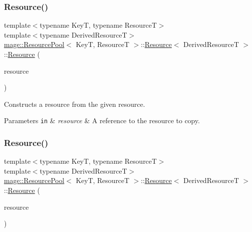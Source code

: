 \subsubsection{\texorpdfstring{Resource()}{Resource()}\hspace{0.1cm}{\footnotesize\ttfamily [2/3]}}
{\footnotesize\ttfamily template$<$typename KeyT, typename ResourceT$>$ \\
template$<$typename Derived\+ResourceT$>$ \\
\hyperlink{classmage_1_1_resource_pool}{mage\+::\+Resource\+Pool}$<$ KeyT, ResourceT $>$\+::\hyperlink{structmage_1_1_resource_pool_1_1_resource}{Resource}$<$ Derived\+ResourceT $>$\+::\hyperlink{structmage_1_1_resource_pool_1_1_resource}{Resource} (\begin{DoxyParamCaption}\item[{const \hyperlink{structmage_1_1_resource_pool_1_1_resource}{Resource}$<$ Derived\+ResourceT $>$ \&}]{resource }\end{DoxyParamCaption})\hspace{0.3cm}{\ttfamily [delete]}}

Constructs a resource from the given resource.


\begin{DoxyParams}[1]{Parameters}
\mbox{\tt in}  & {\em resource} & A reference to the resource to copy. \\
\hline
\end{DoxyParams}
\hypertarget{structmage_1_1_resource_pool_1_1_resource_a77ee754c3f9ce59cfd378b72b8b1bd52}{}\label{structmage_1_1_resource_pool_1_1_resource_a77ee754c3f9ce59cfd378b72b8b1bd52} 
\subsubsection{\texorpdfstring{Resource()}{Resource()}\hspace{0.1cm}{\footnotesize\ttfamily [3/3]}}
{\footnotesize\ttfamily template$<$typename KeyT, typename ResourceT$>$ \\
template$<$typename Derived\+ResourceT$>$ \\
\hyperlink{classmage_1_1_resource_pool}{mage\+::\+Resource\+Pool}$<$ KeyT, ResourceT $>$\+::\hyperlink{structmage_1_1_resource_pool_1_1_resource}{Resource}$<$ Derived\+ResourceT $>$\+::\hyperlink{structmage_1_1_resource_pool_1_1_resource}{Resource} (\begin{DoxyParamCaption}\item[{\hyperlink{structmage_1_1_resource_pool_1_1_resource}{Resource}$<$ Derived\+ResourceT $>$ \&\&}]{resource }\end{DoxyParamCaption})}

